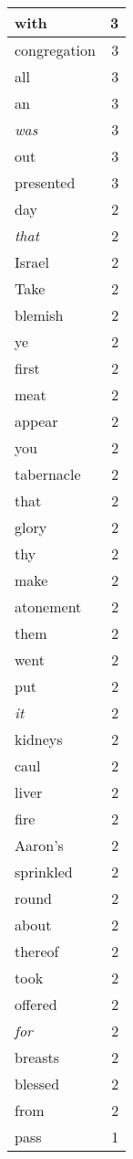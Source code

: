 \begin{center}
\begin{longtable}{l|r}
with & 3 \\ \hline
congregation & 3 \\ \hline
all & 3 \\ \hline
an & 3 \\ \hline
\emph{was} & 3 \\ \hline
out & 3 \\ \hline
presented & 3 \\ \hline
day & 2 \\ \hline
\emph{that} & 2 \\ \hline
Israel & 2 \\ \hline
Take & 2 \\ \hline
blemish & 2 \\ \hline
ye & 2 \\ \hline
first & 2 \\ \hline
meat & 2 \\ \hline
appear & 2 \\ \hline
you & 2 \\ \hline
tabernacle & 2 \\ \hline
that & 2 \\ \hline
glory & 2 \\ \hline
thy & 2 \\ \hline
make & 2 \\ \hline
atonement & 2 \\ \hline
them & 2 \\ \hline
went & 2 \\ \hline
put & 2 \\ \hline
\emph{it} & 2 \\ \hline
kidneys & 2 \\ \hline
caul & 2 \\ \hline
liver & 2 \\ \hline
fire & 2 \\ \hline
Aaron's & 2 \\ \hline
sprinkled & 2 \\ \hline
round & 2 \\ \hline
about & 2 \\ \hline
thereof & 2 \\ \hline
took & 2 \\ \hline
offered & 2 \\ \hline
\emph{for} & 2 \\ \hline
breasts & 2 \\ \hline
blessed & 2 \\ \hline
from & 2 \\ \hline
pass & 1 \\ \hline

\end{longtable}
\end{center}

